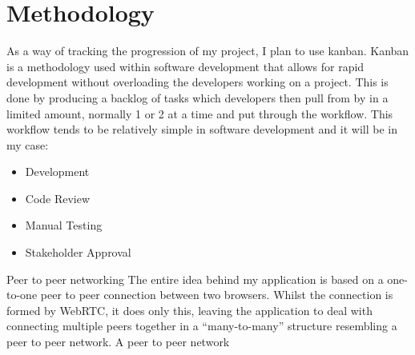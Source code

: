 \documentclass[]{report}
\begin{document}
\section{Methodology}

As a way of tracking the progression of my project, I plan to use kanban. Kanban is a methodology used within software development that allows for rapid development without overloading the developers working on a project. This is done by producing a backlog of tasks which developers then pull from by in a limited amount, normally 1 or 2 at a time and put through the workflow. This workflow tends to be relatively simple in software development and it will be in my case:

	\begin{itemize}
		\item Development
		\item Code Review
		\item Manual Testing
		\item Stakeholder Approval
	\end{itemize}

Peer to peer networking
The entire idea behind my application is based on a one-to-one peer to peer connection between two browsers. Whilst the connection is formed by WebRTC, it does only this, leaving the application to deal with connecting multiple peers together in a “many-to-many” structure resembling a peer to peer network.
A peer to peer network 
\end{document}
